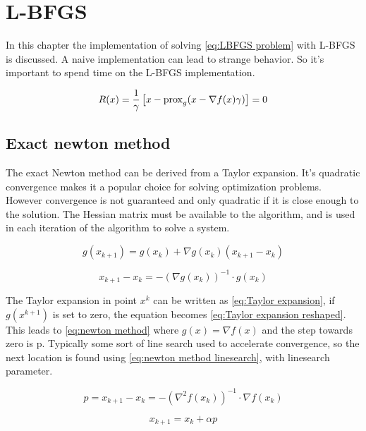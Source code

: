 \chapter{L-BFGS}
	In this chapter the implementation of solving \eqref{eq:LBFGS problem} with L-BFGS is discussed. A naive implementation can lead to strange behavior. So it's important to spend time on the L-BFGS implementation.
	
	
	\begin{equation}
	R(x) = \frac{1}{\gamma}\left[ x - \operatorname{prox}_g( x - \nabla f(x)\gamma) \right] = 0
	\label{eq:LBFGS problem}
	\end{equation}
	
	\section{Exact newton method}
	The exact Newton method can be derived from a Taylor expansion. It's quadratic convergence makes it a popular choice for solving optimization problems. However convergence is not guaranteed and only quadratic if it is close enough to the solution. The Hessian matrix must be available to the algorithm, and is used in each iteration of the algorithm to solve a system.
	
		\begin{equation}
			g(x_{k+1}) = g(x_k) + \nabla g(x_k)(x_{k+1}-x_k)
			\label{eq:Taylor expansion}
		\end{equation}
		
		\begin{equation}
			x_{k+1}-x_k = -(\nabla g(x_k))^{-1} \cdot g(x_k)
			\label{eq:Taylor expansion reshaped}
		\end{equation}
		
	The Taylor expansion in point $x^k$ can be written as \eqref{eq:Taylor expansion}, if $g(x^{k+1})$ is set to zero, the equation becomes \eqref{eq:Taylor expansion reshaped}. This leads to \eqref{eq:newton method} where $g(x)=\nabla f(x)$ and the step towards zero is p. Typically some sort of line search used to accelerate convergence, so the next location is found using \eqref{eq:newton method linesearch}, with linesearch parameter.	
	
		\begin{equation}
			p = x_{k+1}-x_k = -(\nabla^2 f(x_k))^{-1} \cdot \nabla f(x_k)
			\label{eq:newton method}	
		\end{equation}
	
		\begin{equation}
		 	x_{k+1} = x_k + \alpha p
		 	\label{eq:newton method linesearch}
		\end{equation}
		
